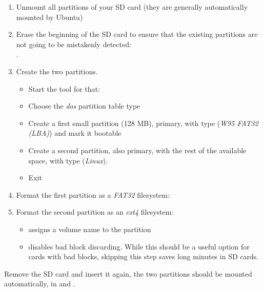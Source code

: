 \begin{enumerate}

\item Unmount all partitions of your SD card (they are generally
  automatically mounted by Ubuntu)

\item Erase the beginning of the SD card to ensure that the existing
  partitions are not going to be mistakenly detected:\\
  .

\item Create the two partitions.

  \begin{itemize}

  \item Start the  tool for that:\\

  \item Choose the {\em dos} partition table type

  \item Create a first small partition (128 MB), primary, with type
     ({\em W95 FAT32 (LBA)}) and mark it bootable

  \item Create a second partition, also primary, with the rest of the
    available space, with type  ({\em Linux}).

  \item Exit 

  \end{itemize}

\item Format the first partition as a {\em FAT32} filesystem:\\

\item Format the second partition as an {\em ext4} filesystem:\\

\begin{itemize}
\item {} assigns a volume name to the partition
\item {} disables bad block discarding. While this
      should be a useful option for cards with bad blocks, skipping
      this step saves long minutes in SD cards.
\end{itemize}
\end{enumerate}

Remove the SD card and insert it again, the two partitions should be
mounted automatically, in  and
.
